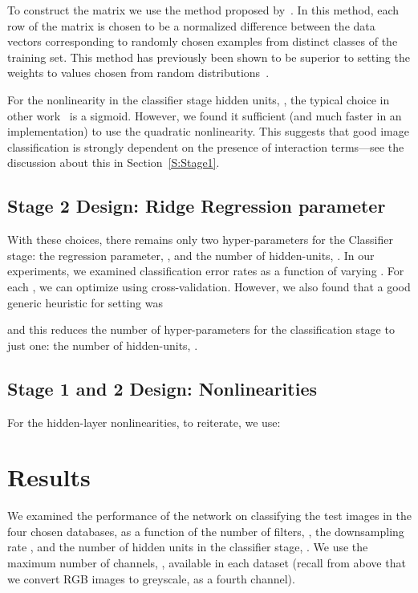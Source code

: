 \documentclass[conference]{IEEEtran}
\begin{document}
To construct the  matrix  we use the method proposed by~\cite{Zhu.14}. In this method, each row of the matrix  is chosen to be a normalized difference between the data vectors corresponding to randomly chosen examples from distinct classes of the training set. This method has previously been shown to be superior to setting the weights to values chosen from random distributions~\cite{Zhu.14,McDonnell.15PLOS}.

For the nonlinearity in the classifier stage hidden units, , the typical choice in other work~\cite{Huang.14}  is  a sigmoid. However, we found it sufficient (and much faster in an implementation) to use the quadratic nonlinearity. This suggests that good image classification is strongly dependent on  the presence of interaction terms---see the discussion about this in Section~\ref{S:Stage1}.

\subsection{Stage 2 Design: Ridge Regression parameter}

With these choices, there remains only two hyper-parameters for the Classifier stage: the regression parameter, , and the number of hidden-units, . In our experiments, we examined classification error rates as a function of varying . For each , we can optimize  using cross-validation. However, we also found that a good generic heuristic for setting  was
 
and this reduces the number of hyper-parameters for the classification stage to just one: the number of hidden-units, .

\subsection{Stage 1 and 2 Design: Nonlinearities}

For the hidden-layer nonlinearities, to reiterate, we use:




\section{Results}\label{S:4}

We examined the performance of the network on classifying the test images in the four chosen databases, as a function of the number of filters, , the downsampling rate , and the number of hidden units in the classifier stage, . We use the maximum number of channels, , available in each dataset (recall from above that we convert RGB images to greyscale, as a fourth channel). 
\end{document}

